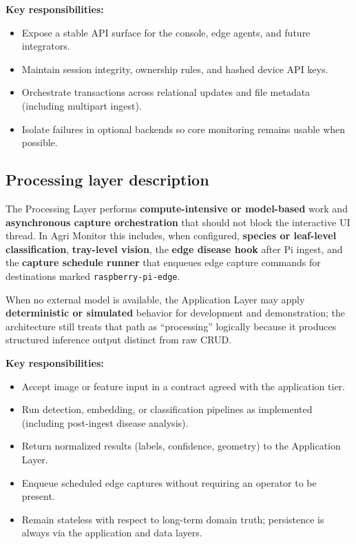 \textbf{Key responsibilities:}
\begin{itemize}
  \item Expose a stable API surface for the console, edge agents, and future integrators.
  \item Maintain session integrity, ownership rules, and hashed device API keys.
  \item Orchestrate transactions across relational updates and file metadata (including multipart ingest).
  \item Isolate failures in optional backends so core monitoring remains usable when possible.
\end{itemize}

\subsection{Processing layer description}

The Processing Layer performs \textbf{compute-intensive or model-based} work and \textbf{asynchronous capture orchestration} that should not block the interactive UI thread. In Agri Monitor this includes, when configured, \textbf{species or leaf-level classification}, \textbf{tray-level vision}, the \textbf{edge disease hook} after Pi ingest, and the \textbf{capture schedule runner} that enqueues edge capture commands for destinations marked \texttt{raspberry-pi-edge}.

When no external model is available, the Application Layer may apply \textbf{deterministic or simulated} behavior for development and demonstration; the architecture still treats that path as ``processing'' logically because it produces structured inference output distinct from raw CRUD.

\textbf{Key responsibilities:}
\begin{itemize}
  \item Accept image or feature input in a contract agreed with the application tier.
  \item Run detection, embedding, or classification pipelines as implemented (including post-ingest disease analysis).
  \item Return normalized results (labels, confidence, geometry) to the Application Layer.
  \item Enqueue scheduled edge captures without requiring an operator to be present.
  \item Remain stateless with respect to long-term domain truth; persistence is always via the application and data layers.
\end{itemize}

